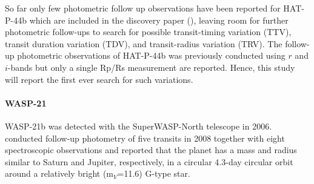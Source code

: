 So far only few photometric follow up observations have been reported for HAT-P-44b which are included in the discovery paper (\cite{Hartmann2014}), leaving room for further photometric follow-ups to search for possible transit-timing variation (TTV), transit duration variation (TDV), and transit-radius variation (TRV). The follow-up photometric observations of HAT-P-44b was previously conducted using $r$ and $i$-bands but only a single Rp/Rs measurement are reported. Hence, this study will report the first ever search for such variations.


\paragraph{WASP-21}
WASP-21b was detected with the SuperWASP-North telescope
in 2006. \cite{Bouchy2010} %
conducted follow-up photometry of five transits in 2008 together with eight spectroscopic observations and reported that the planet has a mass and radius %
similar to Saturn and Jupiter, respectively, in a circular 4.3-day circular orbit around a relatively bright (m$_V$=11.6) G-type star.


